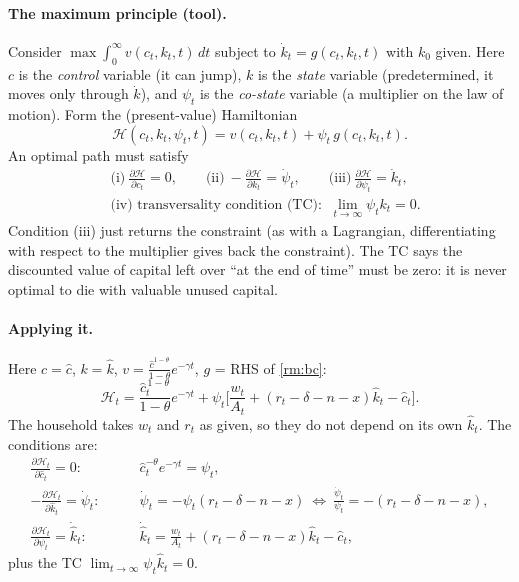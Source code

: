 \paragraph{The maximum principle (tool).} Consider $\max\int_0^\infty v(c_t,k_t,t)\,dt$ subject to $\dot k_t=g(c_t,k_t,t)$ with $k_0$ given. Here $c$ is the \emph{control} variable (it can jump), $k$ is the \emph{state} variable (predetermined, it moves only through $\dot k$), and $\psi_t$ is the \emph{co-state} variable (a multiplier on the law of motion). Form the (present-value) Hamiltonian
\[
\mathcal H(c_t,k_t,\psi_t,t)=v(c_t,k_t,t)+\psi_t\,g(c_t,k_t,t).
\]
An optimal path must satisfy
\begin{align*}
&\text{(i)}\ \frac{\partial\mathcal H}{\partial c_t}=0,\qquad
\text{(ii)}\ -\frac{\partial\mathcal H}{\partial k_t}=\dot\psi_t,\qquad
\text{(iii)}\ \frac{\partial\mathcal H}{\partial \psi_t}=\dot k_t,\\
&\text{(iv) transversality condition (TC): }\ \lim_{t\to\infty}\psi_tk_t=0 .
\end{align*}
Condition (iii) just returns the constraint (as with a Lagrangian, differentiating with respect to the multiplier gives back the constraint). The TC says the discounted value of capital left over ``at the end of time'' must be zero: it is never optimal to die with valuable unused capital.

\paragraph{Applying it.} Here $c=\hat c$, $k=\hat k$, $v=\frac{\hat c^{1-\theta}}{1-\theta}e^{-\gamma t}$, $g$ = RHS of \eqref{rm:bc}:
\[
\mathcal H_t=\frac{\hat c_t^{\,1-\theta}}{1-\theta}e^{-\gamma t}+\psi_t\Big[\frac{w_t}{A_t}+(r_t-\delta-n-x)\hat k_t-\hat c_t\Big].
\]
The household takes $w_t$ and $r_t$ as given, so they do not depend on its own $\hat k_t$. The conditions are:
\begin{align}
\frac{\partial\mathcal H_t}{\partial\hat c_t}=0:&\qquad \hat c_t^{-\theta}e^{-\gamma t}=\psi_t, \label{rm:foc1}\\
-\frac{\partial\mathcal H_t}{\partial\hat k_t}=\dot\psi_t:&\qquad \dot\psi_t=-\psi_t(r_t-\delta-n-x)\ \Longleftrightarrow\ \frac{\dot\psi_t}{\psi_t}=-(r_t-\delta-n-x), \label{rm:foc2}\\
\frac{\partial\mathcal H_t}{\partial\psi_t}=\dot{\hat k}_t:&\qquad \dot{\hat k}_t=\frac{w_t}{A_t}+(r_t-\delta-n-x)\hat k_t-\hat c_t, \label{rm:foc3}
\end{align}
plus the TC $\lim_{t\to\infty}\psi_t\hat k_t=0$.

